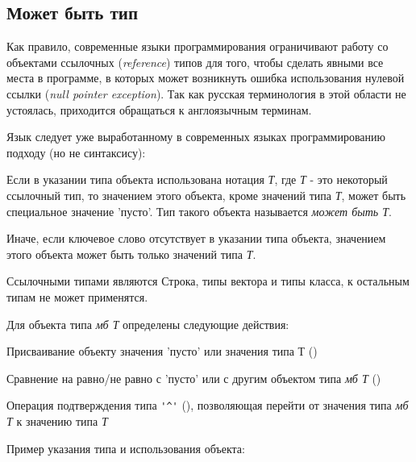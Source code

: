 \hypertarget{mb-types}{%
\subsection{Может быть тип}\label{decls:mb-types}}

Как правило, современные языки программирования ограничивают работу со объектами ссылочных (\emph{reference}) типов для того, 
чтобы сделать явными все места в программе, в которых может возникнуть ошибка использования нулевой ссылки (\emph{null pointer exception}). 
Так как русская терминология в этой области не устоялась, приходится обращаться к англоязычным терминам.

Язык \thelang{} следует уже выработанному в современных языках программированию подходу (но не синтаксису):
\begin{d_itemize}
\item
    Если в указании типа объекта использована нотация \emph{ Т}, где \emph{Т} - это некоторый ссылочный тип,  
    то значением этого объекта, кроме значений типа \emph{Т}, может быть специальное значение 'пусто'. Тип такого объекта называется \emph{может быть Т}.
\item
    Иначе, если ключевое слово  отсутствует в указании типа объекта, значением этого объекта может быть только значений типа \emph{Т}.
\end{d_itemize}

Ссылочными типами являются Строка, типы вектора и типы класса, к остальным типам  не может применятся.

Для объекта типа \emph{мб Т} определены следующие действия:
\begin{d_itemize}
\item
    Присваивание объекту значения 'пусто' или значения типа Т ()
\item
    Сравнение на равно/не равно с 'пусто'  или с другим объектом типа \emph{мб Т} ()
\item
    Операция подтверждения типа \verb+'^'+ (), позволяющая перейти от значения типа \emph{мб Т} к значению типа \emph{Т}
\end{d_itemize}

\bigskip
Пример указания типа и использования объекта:


